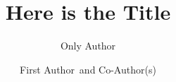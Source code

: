 \documentclass[mathpazo]{csiam-am}
\begin{document}
\title{Here is the Title}

\author[O.~Author]{Only Author\corrauth}
\address{School of Mathematical Sciences, Beijing Normal University,
Beijing 100875, P.R. China}

\author[F.~Author and A.~Co-Author(s)]{First Author\comma\corrauth\ and Co-Author(s)}
\address{\ address of First Author\\
\ address of Co-Author(s)}

%
%
\end{document}
